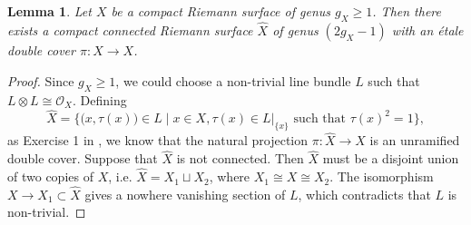\documentclass[12pt]{article}
\newtheorem{lem}{Lemma}[section]
\begin{document}
\begin{lem}
\label{lem:doublecover}
Let $X$ be a compact Riemann surface of genus $g_{X} \geq 1$. Then there exists a compact connected Riemann surface $\widehat{X}$ of genus $\left( 2g_{X} - 1 \right)$ with an \'etale double cover $\pi \colon \widehat{X} \rightarrow X$.
\end{lem}
\begin{proof}
Since $g_X \geq 1$, we could choose a non-trivial line bundle $L$ such that $L\otimes L \cong {\mathcal O}_X$. Defining
\[ \widehat{X} = \Big\{ \big(x, \tau(x)\big)\in L \mid x \in X, \tau(x) \in L|_{\{x\}} \text{ such that } \tau(x)^{2} = 1\Big\}, \]
as Exercise 1 in \cite[Chapter 2]{Voisin02}, we know that the natural projection $\pi\colon \widehat{X} \rightarrow X$ is an unramified double cover. Suppose that $\widehat{X}$ is not connected. Then $\widehat{X}$ must be a disjoint union of two copies of $X$, i.e.
$\widehat{X} = X_{1} \sqcup X_{2}$,
where $X_{1} \cong X \cong X_{2}$. The isomorphism $X \rightarrow X_{1} \subset \widehat{X}$ gives a nowhere vanishing section of $L$, which contradicts that $L$ is non-trivial.
\end{proof}
\end{document}
